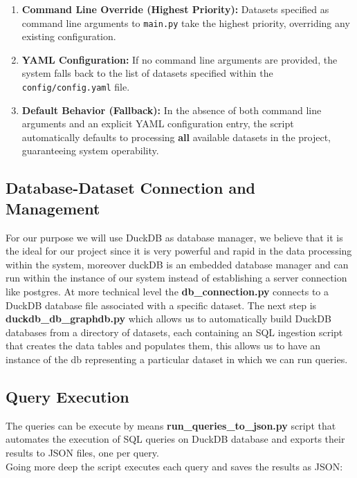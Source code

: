\documentclass[12pt,a4paper]{article}
\begin{document}
\begin{enumerate}
    \item \textbf{Command Line Override (Highest Priority):} Datasets specified as command line arguments to \texttt{main.py} take the highest priority, overriding any existing configuration.
    
    \item \textbf{YAML Configuration:} If no command line arguments are provided, the system falls back to the list of datasets specified within the \texttt{config/config.yaml} file.
    
    \item \textbf{Default Behavior (Fallback):} In the absence of both command line arguments and an explicit YAML configuration entry, the script automatically defaults to processing \textbf{all} available datasets in the project, guaranteeing system operability.
\end{enumerate}



\subsection{Database-Dataset Connection and Management}
For our purpose we will use DuckDB as database manager, we believe that it is the ideal for our project since it is very powerful and rapid in the data processing within the system, moreover duckDB is an embedded database manager and can run within the instance of our system instead of establishing a server connection like postgres.
At more technical level the \textbf{db\_connection.py} connects to a DuckDB database file associated with a specific dataset.
The next step is \textbf{duckdb\_db\_graphdb.py} which allows us to automatically build DuckDB databases from a directory of datasets, each containing an SQL ingestion script that creates the data tables and populates them,  this allows us to have an instance of the db representing a particular dataset  in which we can run queries.

\subsection{Query Execution}
The queries can be execute by means \textbf{run\_queries\_to\_json.py} script that automates the execution of SQL queries on DuckDB database and exports their results to JSON files, one per query.\\
Going more deep the script executes each query and saves the results as JSON:
\end{document}
